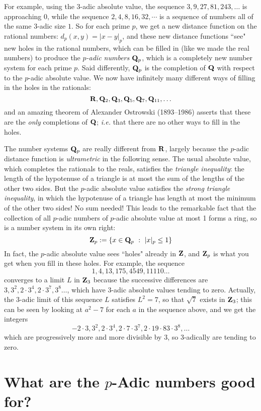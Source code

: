 \documentclass[11pt,oneside]{amsart}
\begin{document}
For example, using the $3$-adic absolute value, the sequence $3,9,27,81,243,\ldots$ is approaching 0,
while the sequence $2,4,8,16,32,\cdots$ is a sequence of numbers all of the same $3$-adic size $1$.
So for each prime $p$, we get a new distance function on the rational numbers: $d_p(x,y)=|x-y|_p$,
and these new distance functions ``see" new holes in the rational numbers, which can be filled in (like we made the real numbers)
to produce the {\em $p$-adic numbers $\mathbf{Q}_p$}, which is a completely new number system for each prime $p$.
Said differently, $\mathbf{Q}_p$ is the completion of $\mathbf{Q}$ with respect to the $p$-adic absolute value.
We now have infinitely many different ways of filling in the holes in the rationals:
$$
  \mathbf{R}, \mathbf{Q}_2, \mathbf{Q}_3, \mathbf{Q}_5, \mathbf{Q}_7, \mathbf{Q}_{11}, \ldots
$$
and an amazing theorem of Alexander Ostrowski (1893--1986) asserts that these are the {\em only} completions of $\mathbf{Q}$;
{\em i.e.} that there are no other ways to fill in the holes.

The number systems $\mathbf{Q}_p$ are really different from $\mathbf{R}$, largely because the $p$-adic distance function is {\em ultrametric}
in the following sense.
The usual absolute value, which completes the rationals to the reals, satisfies the {\em triangle inequality}: 
the length of the hypotenuse of a triangle is at most the sum of the lengths of the other two sides.  But the $p$-adic
absolute value satisfies the {\em strong triangle inequality}, in which the hypotenuse of a triangle has length at most the
minimum of the other two sides!  No sum needed!  This leads to the remarkable fact that the collection of all
$p$-adic numbers of $p$-adic absolute value at most 1 forms a ring, so is a number system in its own right:
$$
	\mathbf{Z}_p:=\{x\in \mathbf{Q}_p \ :\ |x|_p \le 1\}
$$
In fact, the $p$-adic absolute value sees ``holes" already in $\mathbf{Z}$, and $\mathbf{Z}_p$ is what you get when you fill in these holes.
For example, the sequence
$$
	1, 4, 13, 175, 4549, 11110\ldots
$$
converges to a limit $L$ in $\mathbf{Z}_3$ because the successive differences are $3,3^2,2\cdot 3^4, 2\cdot 3^7, 3^8\ldots$,
which have $3$-adic absolute values tending to zero.  Actually, the $3$-adic limit of this sequence $L$ satisfies $L^2 = 7$,
so that $\sqrt{7}$ exists in $\mathbf{Z}_3$; this can be seen by looking at $a^2 - 7$ for each $a$ in the sequence above, and we get the
integers
$$
	-2\cdot 3, 3^2, 2\cdot 3^4, 2\cdot 7\cdot 3^7,2\cdot19\cdot 83\cdot 3^8,\ldots
$$
which are progressively more and more divisible by $3$, so $3$-adically are tending to zero.


\section{What are the $p$-Adic numbers good for?}
\end{document}
